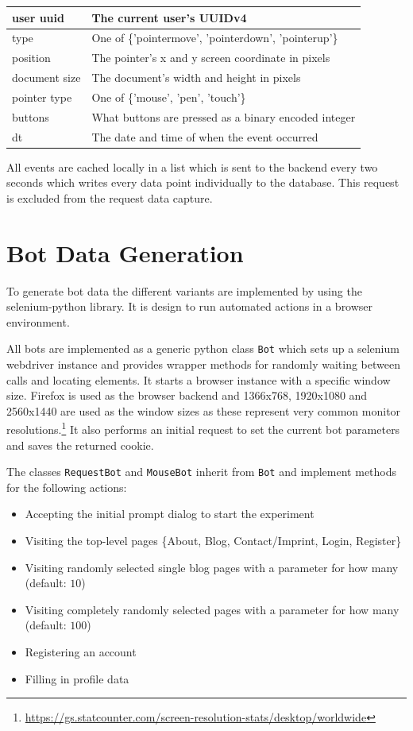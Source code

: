 \documentclass[
    fontsize=12pt,
    headings=small,
    parskip=half,           %
    bibliography=totoc,
    numbers=noenddot,       %
    open=any,               %
    final                   %
]{scrreprt}
\begin{document}
\begin{table}[]
\begin{tabular}{|l|l|}
\hline
user uuid & The current user's UUIDv4 \\ \hline
type & One of \{'pointermove', 'pointerdown', 'pointerup'\} \\ \hline
position & The pointer's x and y screen coordinate in pixels \\ \hline
document size & The document's width and height in pixels \\ \hline
pointer type & One of \{'mouse', 'pen', 'touch'\} \\ \hline
buttons & What buttons are pressed as a binary encoded integer \\ \hline
dt & The date and time of when the event occurred \\ \hline

\end{tabular}
\end{table}

All events are cached locally in a list which is sent to the backend every two seconds which writes every data point individually to the database. This request is excluded from the request data capture.

\section{Bot Data Generation}

To generate bot data the different variants are implemented by using the selenium-python \cite{SELENIUMPYTHON} library. It is design to run automated actions in a browser environment.


All bots are implemented as a generic python class \lstinline{Bot} which sets up a selenium\cite{SELENIUMPYTHON} webdriver instance and provides wrapper methods for randomly waiting between calls and locating elements. It starts a  browser instance with a specific window size. Firefox is used as the browser backend and 1366x768, 1920x1080 and 2560x1440 are used as the window sizes as these represent very common monitor resolutions.\footnote{\url{https://gs.statcounter.com/screen-resolution-stats/desktop/worldwide}} It also performs an initial request to set the current bot parameters and saves the returned cookie.

The classes \lstinline{RequestBot} and \lstinline{MouseBot} inherit from \lstinline{Bot} and implement methods for the following actions:

\begin{itemize}
	\item Accepting the initial prompt dialog to start the experiment
	\item Visiting the top-level pages \{About, Blog, Contact/Imprint, Login, Register\}
	\item Visiting randomly selected single blog pages with a parameter for how many (default: $10$)
	\item Visiting completely randomly selected pages with a parameter for how many (default: $100$)
	\item Registering an account
	\item Filling in profile data
\end{itemize}
\end{document}
